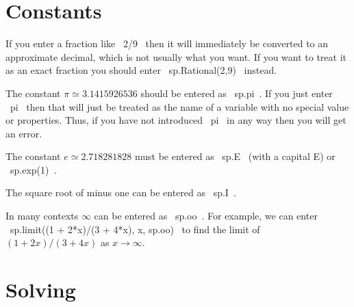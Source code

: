 \documentclass[a4paper,10pt]{amsbook}
\begin{document}
\section{Constants}

\begin{secenum}
 \item\label{rational} If you enter a fraction like \pcode~2/9~ then it
  will immediately be converted to an approximate decimal, which is 
  not usually what you want.  If you want to treat it as an exact 
  fraction you should enter \pcode~sp.Rational(2,9)~ instead.
%
 \item\label{pi} The constant $\pi\simeq 3.1415926536$ should be entered as
  \pcode~sp.pi~.  If you just enter \pcode~pi~ then that will just 
  be treated as the name of a variable with no special value or
  properties.  Thus, if you have not introduced \pcode~pi~ in any way
  then you will get an error. 
%
 \item\label{exp} The constant $e\simeq 2.718281828$ must be entered as 
  \pcode~sp.E~ (with a capital E) or \pcode~sp.exp(1)~.  
%
 \item\label{imaginary} The square root of minus one can be
  entered as \pcode~sp.I~.
%
 \item\label{infinity} In many contexts $\infty$ can be entered as
 \pcode~sp.oo~.  For example, we can enter \\
 \pcode~sp.limit((1 + 2*x)/(3 + 4*x), x, sp.oo)~ to find the 
 limit of $(1+2x)/(3+4x)$ as $x\to\infty$.
\end{secenum}

\section{Solving}
\end{document}

